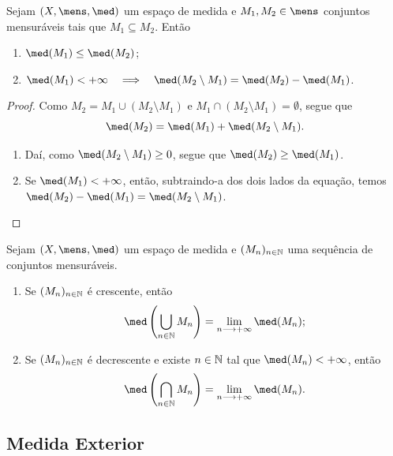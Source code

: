 \begin{prop}
Sejam $(X, \mens,\med)$ um espaço de medida e $M_1,M_2 \in \mens$ conjuntos mensuráveis tais que $M_1 \subseteq M_2$. Então
	\begin{enumerate}
	\item $\med(M_1) \leq \med(M_2)$;
	\item $\med(M_1) < + \infty \entao \med(M_2 \setminus M_1) = \med(M_2) - \med(M_1)$.
	\end{enumerate}
\end{prop}
\begin{proof}
	Como $M_2 = M_1 \cup (M_2 \setminus M_1)$ e $M_1 \cap (M_2 \setminus M_1) = \emptyset$, segue que
	\begin{equation*}
	\med(M_2)=\med(M_1)+\med(M_2 \setminus M_1).
	\end{equation*}
	\begin{enumerate}
	\item Daí, como $\med(M_2 \setminus M_1) \geq 0$, segue que $\med(M_2) \geq \med(M_1)$.
	\item Se $\med(M_1) < + \infty$, então, subtraindo-a dos dois lados da equação, temos $\med(M_2)-\med(M_1)=\med(M_2 \setminus M_1)$.
	\end{enumerate}
\end{proof}

\begin{prop}
Sejam $(X, \mens,\med)$ um espaço de medida e $(M_n)_{n \in \mathbb{N}}$ uma sequência de conjuntos mensuráveis.
	\begin{enumerate}
	\item Se $(M_n)_{n \in \mathbb{N}}$ é crescente, então
		\begin{equation*}
		\med \left( \bigcup_{n \in \N} M_n \right) = \lim_{n \to +\infty} \med(M_n);
		\end{equation*}
	\item Se $(M_n)_{n \in \mathbb{N}}$ é decrescente e existe $n \in \mathbb{N}$ tal que $\med(M_n) < + \infty$, então
		\begin{equation*}
		\med \left( \bigcap_{n \in \N} M_n \right) = \lim_{n \to +\infty} \med(M_n).
		\end{equation*}
	\end{enumerate}
\end{prop}







\subsection{Medida Exterior}

